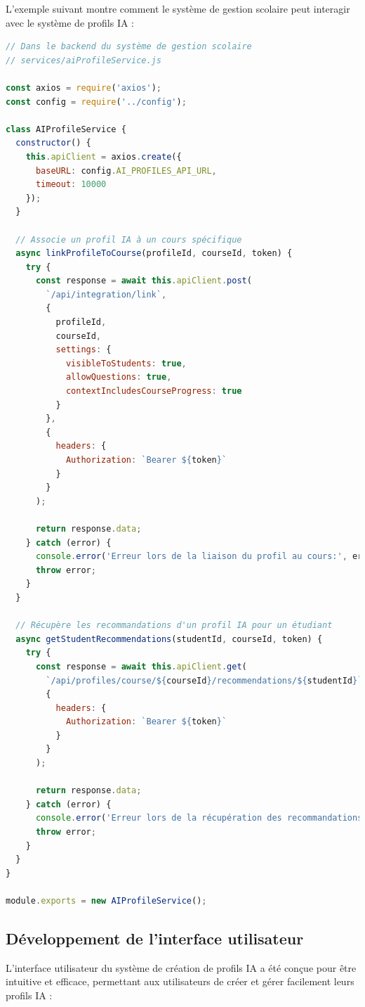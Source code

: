 L'exemple suivant montre comment le système de gestion scolaire peut interagir avec le système de profils IA :

\begin{lstlisting}[style=codestyle, language=JavaScript]
// Dans le backend du système de gestion scolaire
// services/aiProfileService.js

const axios = require('axios');
const config = require('../config');

class AIProfileService {
  constructor() {
    this.apiClient = axios.create({
      baseURL: config.AI_PROFILES_API_URL,
      timeout: 10000
    });
  }

  // Associe un profil IA à un cours spécifique
  async linkProfileToCourse(profileId, courseId, token) {
    try {
      const response = await this.apiClient.post(
        `/api/integration/link`,
        {
          profileId,
          courseId,
          settings: {
            visibleToStudents: true,
            allowQuestions: true,
            contextIncludesCourseProgress: true
          }
        },
        {
          headers: {
            Authorization: `Bearer ${token}`
          }
        }
      );
      
      return response.data;
    } catch (error) {
      console.error('Erreur lors de la liaison du profil au cours:', error);
      throw error;
    }
  }

  // Récupère les recommandations d'un profil IA pour un étudiant
  async getStudentRecommendations(studentId, courseId, token) {
    try {
      const response = await this.apiClient.get(
        `/api/profiles/course/${courseId}/recommendations/${studentId}`,
        {
          headers: {
            Authorization: `Bearer ${token}`
          }
        }
      );
      
      return response.data;
    } catch (error) {
      console.error('Erreur lors de la récupération des recommandations:', error);
      throw error;
    }
  }
}

module.exports = new AIProfileService();
\end{lstlisting}

\subsection{Développement de l'interface utilisateur}

L'interface utilisateur du système de création de profils IA a été conçue pour être intuitive et efficace, permettant aux utilisateurs de créer et gérer facilement leurs profils IA :

